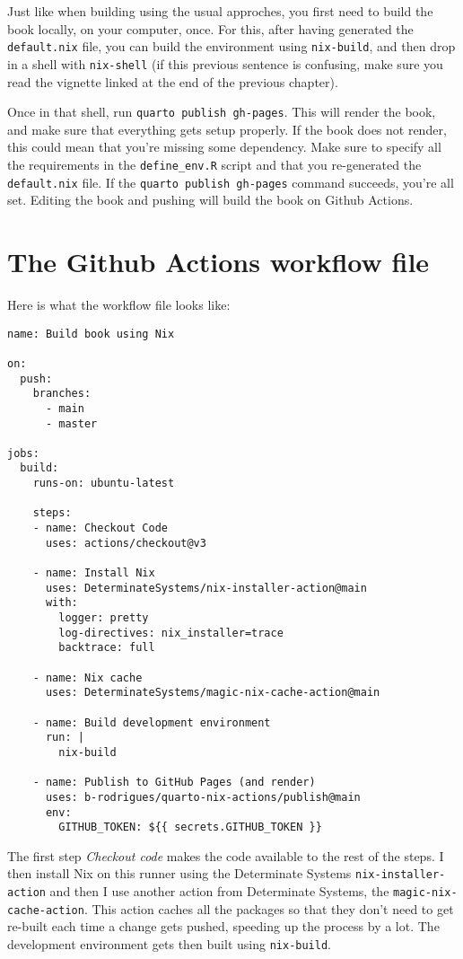 \documentclass[
  letterpaper,
  paper=6in:9in,
  pagesize=pdftex,
  headinclude=on,
  footinclude=on,
  12pt]{scrbook}
\begin{document}
Just like when building using the usual approches, you first need to
build the book locally, on your computer, once. For this, after having
generated the \texttt{default.nix} file, you can build the environment
using \texttt{nix-build}, and then drop in a shell with
\texttt{nix-shell} (if this previous sentence is confusing, make sure
you read the vignette linked at the end of the previous chapter).

Once in that shell, run \texttt{quarto\ publish\ gh-pages}. This will
render the book, and make sure that everything gets setup properly. If
the book does not render, this could mean that you're missing some
dependency. Make sure to specify all the requirements in the
\texttt{define\_env.R} script and that you re-generated the
\texttt{default.nix} file. If the \texttt{quarto\ publish\ gh-pages}
command succeeds, you're all set. Editing the book and pushing will
build the book on Github Actions.

\section{The Github Actions workflow
file}\label{the-github-actions-workflow-file}

Here is what the workflow file looks like:

\begin{verbatim}
name: Build book using Nix

on:
  push:
    branches:
      - main
      - master

jobs:
  build:
    runs-on: ubuntu-latest

    steps:
    - name: Checkout Code
      uses: actions/checkout@v3

    - name: Install Nix
      uses: DeterminateSystems/nix-installer-action@main
      with:
        logger: pretty
        log-directives: nix_installer=trace
        backtrace: full

    - name: Nix cache
      uses: DeterminateSystems/magic-nix-cache-action@main

    - name: Build development environment
      run: |
        nix-build

    - name: Publish to GitHub Pages (and render)
      uses: b-rodrigues/quarto-nix-actions/publish@main
      env:
        GITHUB_TOKEN: ${{ secrets.GITHUB_TOKEN }} 
\end{verbatim}

The first step \emph{Checkout code} makes the code available to the rest
of the steps. I then install Nix on this runner using the Determinate
Systems \texttt{nix-installer-action} and then I use another action from
Determinate Systems, the \texttt{magic-nix-cache-action}. This action
caches all the packages so that they don't need to get re-built each
time a change gets pushed, speeding up the process by a lot. The
development environment gets then built using \texttt{nix-build}.
\end{document}
